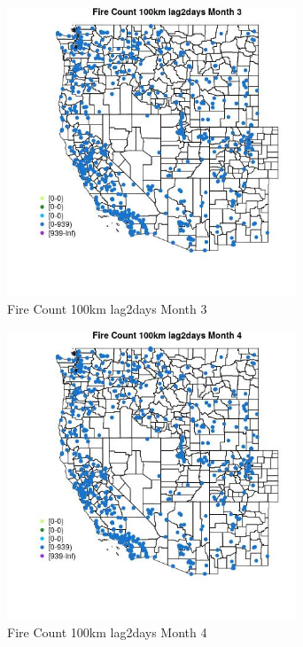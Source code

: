 \begin{figure} 
\centering  
\includegraphics[width=0.77\textwidth]{Code_Outputs/Report_ML_input_PM25_Step4_part_e_de_duplicated_aves_compiled_2019-05-21wNAs_MapObsMo3Fire_Count_100km_lag2days.jpg} 
\caption{\label{fig:Report_ML_input_PM25_Step4_part_e_de_duplicated_aves_compiled_2019-05-21wNAsMapObsMo3Fire_Count_100km_lag2days}Fire Count 100km lag2days Month 3} 
\end{figure} 
 

\begin{figure} 
\centering  
\includegraphics[width=0.77\textwidth]{Code_Outputs/Report_ML_input_PM25_Step4_part_e_de_duplicated_aves_compiled_2019-05-21wNAs_MapObsMo4Fire_Count_100km_lag2days.jpg} 
\caption{\label{fig:Report_ML_input_PM25_Step4_part_e_de_duplicated_aves_compiled_2019-05-21wNAsMapObsMo4Fire_Count_100km_lag2days}Fire Count 100km lag2days Month 4} 
\end{figure} 
 

